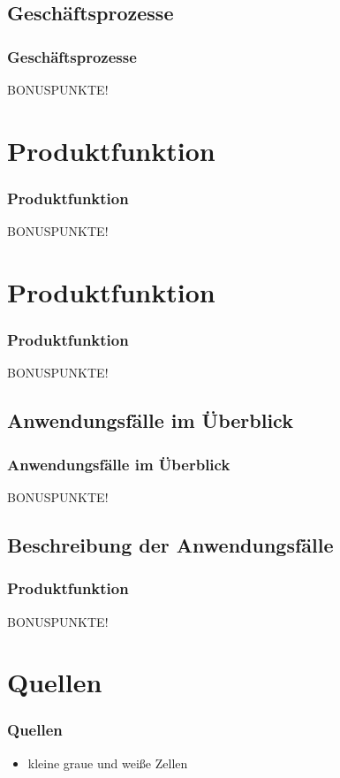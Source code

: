 \documentclass{beamer}
\begin{document}
\subsection{Geschäftsprozesse}		
\begin{frame}
\frametitle{Geschäftsprozesse}
BONUSPUNKTE!
\end{frame}

\section{Produktfunktion}		
\begin{frame}
\frametitle{Produktfunktion}
BONUSPUNKTE!
\end{frame}

\section{Produktfunktion}		
\begin{frame}
\frametitle{Produktfunktion}
BONUSPUNKTE!
\end{frame}

\subsection{Anwendungsfälle im Überblick}		
\begin{frame}
\frametitle{Anwendungsfälle im Überblick}
BONUSPUNKTE!
\end{frame}

\subsection{Beschreibung der Anwendungsfälle}		
\begin{frame}
\frametitle{Produktfunktion}
BONUSPUNKTE!
\end{frame}

\section{Quellen}
\begin{frame}
		\frametitle{Quellen}
		\begin{itemize}
		  \item kleine graue und weiße Zellen
		\end{itemize}
	\end{frame}
\end{document}
